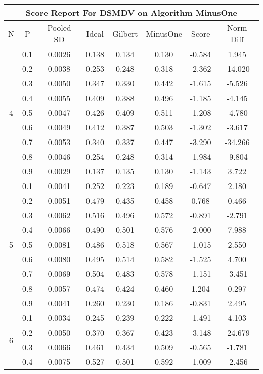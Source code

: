 \documentclass[11pt,a4paper]{report}
\begin{document}
\begin{longtable}{ | c | c || c | c | c | c | c | c | }
\hline
\multicolumn{8}{|c|}{ Score Report For DSMDV on Algorithm MinusOne} \\
\hline
N & P & Pooled SD &  Ideal &  Gilbert & MinusOne  & Score & Norm Diff \\
 \hline
 \hline
 \endhead
\multirow{9}{*}{4} & 0.1 & 0.0026 & 0.138 & 0.134 & 0.130 & -0.584 & 1.945 \\
 & 0.2 & 0.0038 & 0.253 & 0.248 & 0.318 & -2.362 & -14.020 \\
 & 0.3 & 0.0050 & 0.347 & 0.330 & 0.442 & -1.615 & -5.526 \\
 & 0.4 & 0.0055 & 0.409 & 0.388 & 0.496 & -1.185 & -4.145 \\
 & 0.5 & 0.0047 & 0.426 & 0.409 & 0.511 & -1.208 & -4.780 \\
 & 0.6 & 0.0049 & 0.412 & 0.387 & 0.503 & -1.302 & -3.617 \\
 & 0.7 & 0.0053 & 0.340 & 0.337 & 0.447 & -3.290 & -34.266 \\
 & 0.8 & 0.0046 & 0.254 & 0.248 & 0.314 & -1.984 & -9.804 \\
 & 0.9 & 0.0029 & 0.137 & 0.135 & 0.130 & -1.143 & 3.722 \\
 \hline
\multirow{9}{*}{5} & 0.1 & 0.0041 & 0.252 & 0.223 & 0.189 & -0.647 & 2.180 \\
 & 0.2 & 0.0051 & 0.479 & 0.435 & 0.458 & 0.768 & 0.466 \\
 & 0.3 & 0.0062 & 0.516 & 0.496 & 0.572 & -0.891 & -2.791 \\
 & 0.4 & 0.0066 & 0.490 & 0.501 & 0.576 & -2.000 & 7.988 \\
 & 0.5 & 0.0081 & 0.486 & 0.518 & 0.567 & -1.015 & 2.550 \\
 & 0.6 & 0.0080 & 0.495 & 0.514 & 0.582 & -1.525 & 4.700 \\
 & 0.7 & 0.0069 & 0.504 & 0.483 & 0.578 & -1.151 & -3.451 \\
 & 0.8 & 0.0057 & 0.474 & 0.424 & 0.460 & 1.204 & 0.297 \\
 & 0.9 & 0.0041 & 0.260 & 0.230 & 0.186 & -0.831 & 2.495 \\
 \hline
\multirow{9}{*}{6} & 0.1 & 0.0034 & 0.245 & 0.239 & 0.222 & -1.491 & 4.103 \\
 & 0.2 & 0.0050 & 0.370 & 0.367 & 0.423 & -3.148 & -24.679 \\
 & 0.3 & 0.0066 & 0.461 & 0.434 & 0.509 & -0.565 & -1.781 \\
 & 0.4 & 0.0075 & 0.527 & 0.501 & 0.592 & -1.009 & -2.456 \\

\end{longtable}
\end{document}

